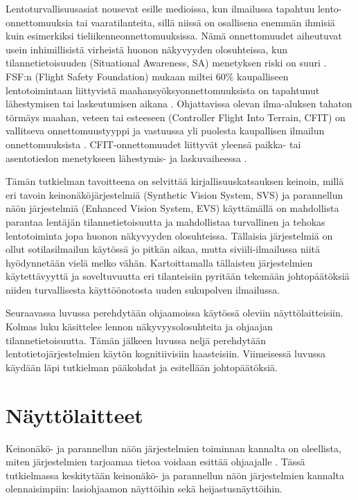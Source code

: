 \documentclass[utf8,bachelor,manualbib]{gradu3}
\begin{document}
Lentoturvallisuusasiat nousevat esille medioissa, kun ilmailussa tapahtuu lento-onnettomuuksia tai vaaratilanteita, sillä niissä on osallisena enemmän ihmisiä kuin esimerkiksi tieliikenneonnettomuuksissa. Nämä onnettomuudet aiheutuvat usein inhimillisistä virheistä huonon näkyvyyden olosuhteissa, kun tilannetietoisuuden (Situational Awareness, SA) menetyksen riski on suuri \citep{kimkaber2014, prinzelym2013, schnellym2004, vygolov2013}. FSF:n (Flight Safety Foundation) mukaan miltei 60\% kaupalliseen lentotoimintaan liittyvistä maahansyöksyonnettomuuksista on tapahtunut lähestymisen tai laskeutumisen aikana \citep{schnellym2004, kimkaber2014}. Ohjattavissa olevan ilma-aluksen tahaton törmäys maahan, veteen tai esteeseen (Controller Flight Into Terrain, CFIT) on vallitseva onnettomuustyyppi ja vastuussa yli puolesta kaupallisen ilmailun onnettomuuksista \citep{etherington2000}. CFIT-onnettomuudet liittyvät yleensä paikka- tai asentotiedon menetykseen lähestymis- ja laskuvaiheessa \citep{schnellym2004}.

Tämän tutkielman tavoitteena on selvittää kirjallisuuskatsauksen keinoin, millä eri tavoin keinonäköjärjestelmiä (Synthetic Vision System, SVS) ja parannellun näön järjestelmiä (Enhanced Vision System, EVS) käyttämällä on mahdollista parantaa lentäjän tilannetietoisuutta ja mahdollistaa turvallinen ja tehokas lentotoiminta jopa huonon näkyvyyden olosuhteissa. Tällaisia järjestelmiä on ollut sotilasilmailun käytössä jo pitkän aikaa, mutta siviili-ilmailussa niitä hyödynnetään vielä melko vähän. Kartoittamalla tällaisten järjestelmien käytettävyyttä ja soveltuvuutta eri tilanteisiin pyritään tekemään johtopäätöksiä niiden turvallisesta käyttöönotosta uuden sukupolven ilmailussa.

Seuraavassa luvussa perehdytään ohjaamoissa käytössä oleviin näyttölaitteisiin. Kolmas luku käsittelee lennon näkyvyysolosuhteita ja ohjaajan tilannetietoisuutta. Tämän jälkeen luvussa neljä perehdytään lentotietojärjestelmien käytön kognitiivisiin haasteisiin. Viimeisessä luvussa käydään läpi tutkielman pääkohdat ja esitellään johtopäätöksiä.

\chapter{Näyttölaitteet}

Keinonäkö- ja parannellun näön järjestelmien toiminnan kannalta on oleellista, miten järjestelmien tarjoamaa tietoa voidaan esittää ohjaajalle \citep{kimkaber2014}. Tässä tutkielmassa keskitytään keinonäkö- ja parannellun näön järjestelmien kannalta olennaisimpiin: lasiohjaamon näyttöihin sekä heijastusnäyttöihin.
\end{document}
